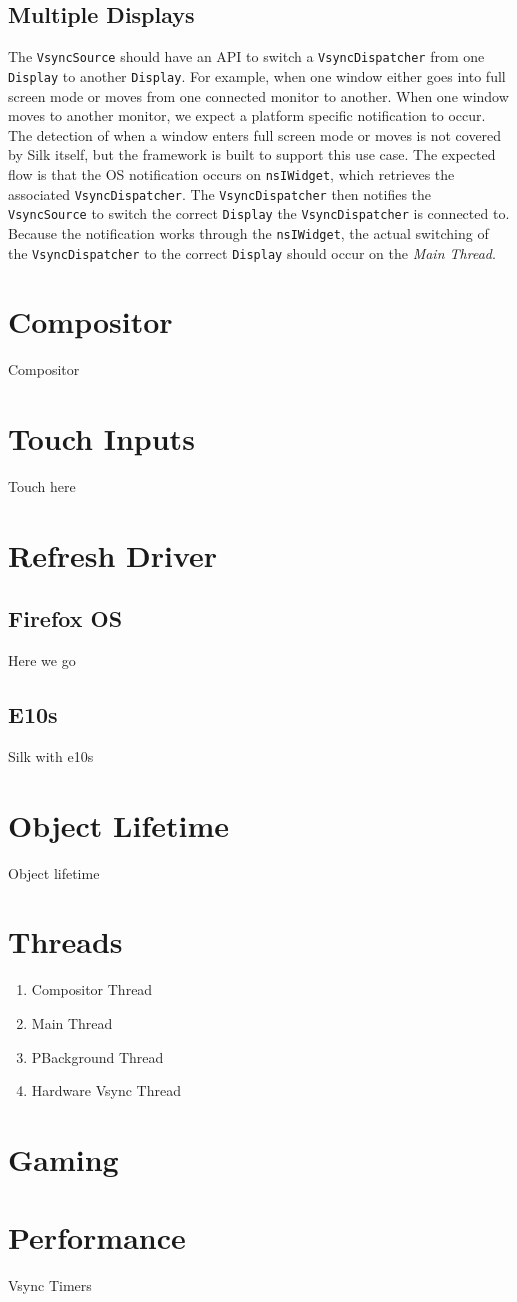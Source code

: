 \documentclass{article}
\begin{document}
\subsection{Multiple Displays}
\label{sec:displays}
The \texttt{VsyncSource} should have an API to switch a \texttt{VsyncDispatcher} from one \texttt{Display} to another \texttt{Display}.
For example, when one window either goes into full screen mode or moves from one connected monitor to another.
When one window moves to another monitor, we expect a platform specific notification to occur.
The detection of when a window enters full screen mode or moves is not covered by Silk itself, but the framework is built to support this use case.
The expected flow is that the OS notification occurs on \texttt{nsIWidget}, which retrieves the associated \texttt{VsyncDispatcher}.
The \texttt{VsyncDispatcher} then notifies the \texttt{VsyncSource} to switch the correct \texttt{Display} the \texttt{VsyncDispatcher} is connected to.
Because the notification works through the \texttt{nsIWidget}, the actual switching of the \texttt{VsyncDispatcher} to the correct \texttt{Display} should occur on the \textit{Main Thread}.

\section{Compositor}
\label{sec:compositor}
Compositor

\section{Touch Inputs}
\label{sec:input}
Touch here

\section{Refresh Driver}
\label{sec:RefreshDriver}

\subsection{Firefox OS}
Here we go

\subsection{E10s}
Silk with e10s

\section{Object Lifetime}
Object lifetime

\section{Threads}
\begin{enumerate}
\item Compositor Thread
\item Main Thread
\item PBackground Thread
\item Hardware Vsync Thread
\end{enumerate}

\section{Gaming}

\section{Performance}
Vsync Timers
\end{document}
